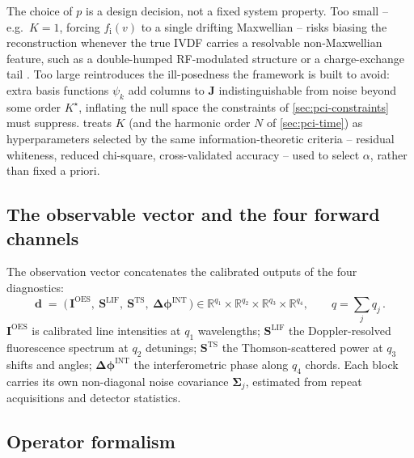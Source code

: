 The choice of $p$ is a design decision, not a fixed system property. Too small -- e.g.\ $K=1$, forcing $f_{\mathrm i}(v)$ to a single drifting Maxwellian -- risks biasing the reconstruction whenever the true IVDF carries a resolvable non-Maxwellian feature, such as a double-humped RF-modulated structure or a charge-exchange tail \cite{ref0096}. Too large reintroduces the ill-posedness the framework is built to avoid: extra basis functions $\psi_{k}$ add columns to $\mathbf J$ indistinguishable from noise beyond some order $K^{\star}$, inflating the null space the constraints of \cref{sec:pci-constraints} must suppress.  treats $K$ (and the harmonic order $N$ of \cref{sec:pci-time}) as hyperparameters selected by the same information-theoretic criteria -- residual whiteness, reduced chi-square, cross-validated accuracy -- used to select $\alpha$, rather than fixed a priori.

\subsection{The observable vector and the four forward channels}

The observation vector concatenates the calibrated outputs of the four diagnostics:
\begin{equation}
\mathbf{d} \;=\; \big(\, \mathbf{I}^{\mathrm{OES}} ,\ \mathbf{S}^{\mathrm{LIF}} ,\ \mathbf{S}^{\mathrm{TS}} ,\ \boldsymbol{\Delta\phi}^{\mathrm{INT}} \,\big) \in \mathbb{R}^{q_{1}}\times\mathbb{R}^{q_{2}}\times\mathbb{R}^{q_{3}}\times\mathbb{R}^{q_{4}} , \qquad q=\textstyle\sum_{j} q_{j} \, . \label{eq:data-vector}
\end{equation}
$\mathbf{I}^{\mathrm{OES}}$ is calibrated line intensities at $q_{1}$ wavelengths; $\mathbf{S}^{\mathrm{LIF}}$ the Doppler-resolved fluorescence spectrum at $q_{2}$ detunings; $\mathbf{S}^{\mathrm{TS}}$ the Thomson-scattered power at $q_{3}$ shifts and angles; $\boldsymbol{\Delta\phi}^{\mathrm{INT}}$ the interferometric phase along $q_{4}$ chords. Each block carries its own non-diagonal noise covariance $\boldsymbol{\Sigma}_{j}$, estimated from repeat acquisitions and detector statistics.

\subsection{Operator formalism}

